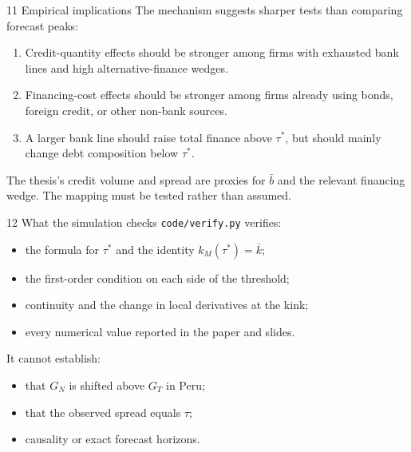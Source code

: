 \documentclass[aspectratio=169,11pt]{beamer}
\begin{document}
\begin{frame}{11 \textperiodcentered{} Empirical implications}
The mechanism suggests sharper tests than comparing forecast peaks:
\begin{enumerate}
  \item Credit-quantity effects should be stronger among firms with exhausted
        bank lines and high alternative-finance wedges.
  \item Financing-cost effects should be stronger among firms already using
        bonds, foreign credit, or other non-bank sources.
  \item A larger bank line should raise total finance above $\tau^*$, but should
        mainly change debt composition below $\tau^*$.
\end{enumerate}

\medskip
The thesis's credit volume and spread are proxies for $\bar b$ and the relevant
financing wedge. The mapping must be tested rather than assumed.
\end{frame}

\begin{frame}{12 \textperiodcentered{} What the simulation checks}
\texttt{code/verify.py} verifies:
\begin{itemize}
  \item the formula for $\tau^*$ and the identity $k_M(\tau^*)=\bar k$;
  \item the first-order condition on each side of the threshold;
  \item continuity and the change in local derivatives at the kink;
  \item every numerical value reported in the paper and slides.
\end{itemize}

\medskip
It cannot establish:
\begin{itemize}
  \item that $G_N$ is shifted above $G_T$ in Peru;
  \item that the observed spread equals $\tau$;
  \item causality or exact forecast horizons.
\end{itemize}
\end{frame}
\end{document}
